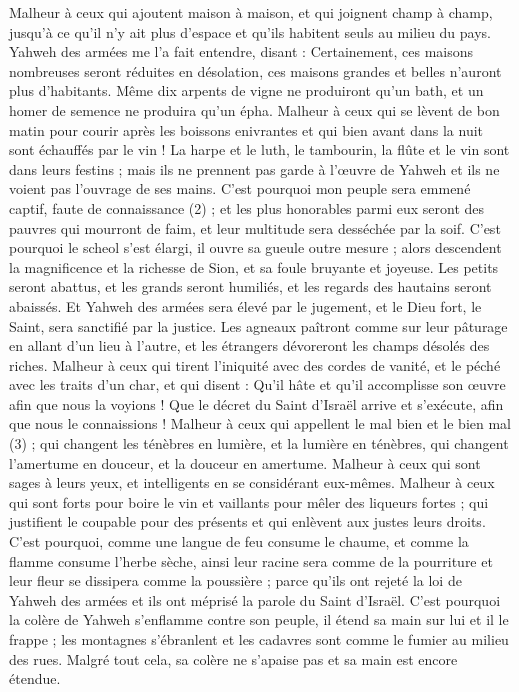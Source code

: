 \begin{multicols}{2}
Malheur à ceux qui ajoutent maison à maison, et qui joignent champ à champ, jusqu’à ce qu'il n'y ait plus d'espace et qu’ils habitent seuls au milieu du pays.
Yahweh des armées me l’a fait entendre, disant : Certainement, ces maisons nombreuses seront réduites en désolation, ces maisons grandes et belles n’auront plus d’habitants.
Même dix arpents de vigne ne produiront qu'un bath, et un homer de semence ne produira qu'un épha.
Malheur à ceux qui se lèvent de bon matin pour courir après les boissons enivrantes et qui bien avant dans la nuit sont échauffés par le vin !
La harpe et le luth, le tambourin, la flûte et le vin sont dans leurs festins ; mais ils ne prennent pas garde à l’œuvre de Yahweh et ils ne voient pas l'ouvrage de ses mains.
C’est pourquoi mon peuple sera emmené captif, faute de connaissance (2) ; et les plus honorables parmi eux seront des pauvres qui mourront de faim, et leur multitude sera desséchée par la soif.
C'est pourquoi le scheol s'est élargi, il ouvre sa gueule outre mesure ; alors descendent la magnificence et la richesse de Sion, et sa foule bruyante et joyeuse.
Les petits seront abattus, et les grands seront humiliés, et les regards des hautains seront abaissés.
Et Yahweh des armées sera élevé par le jugement, et le Dieu fort, le Saint, sera sanctifié par la justice.
Les agneaux paîtront comme sur leur pâturage en allant d'un lieu à l'autre, et les étrangers dévoreront les champs désolés des riches.
Malheur à ceux qui tirent l'iniquité avec des cordes de vanité, et le péché avec les traits d’un char,
et qui disent : Qu’il hâte et qu'il accomplisse son œuvre afin que nous la voyions ! Que le décret du Saint d'Israël arrive et s’exécute, afin que nous le connaissions !
Malheur à ceux qui appellent le mal bien et le bien mal (3) ; qui changent les ténèbres en lumière, et la lumière en ténèbres, qui changent l'amertume en douceur, et la douceur en amertume.
Malheur à ceux qui sont sages à leurs yeux, et intelligents en se considérant eux-mêmes.
Malheur à ceux qui sont forts pour boire le vin et vaillants pour mêler des liqueurs fortes ;
qui justifient le coupable pour des présents et qui enlèvent aux justes leurs droits.
C'est pourquoi, comme une langue de feu consume le chaume, et comme la flamme consume l’herbe sèche, ainsi leur racine sera comme de la pourriture et leur fleur se dissipera comme la poussière ; parce qu'ils ont rejeté la loi de Yahweh des armées et ils ont méprisé la parole du Saint d'Israël.
C'est pourquoi la colère de Yahweh s’enflamme contre son peuple, il étend sa main sur lui et il le frappe ; les montagnes s’ébranlent et les cadavres sont comme le fumier au milieu des rues. Malgré tout cela, sa colère ne s’apaise pas et sa main est encore étendue.

\end{multicols}
